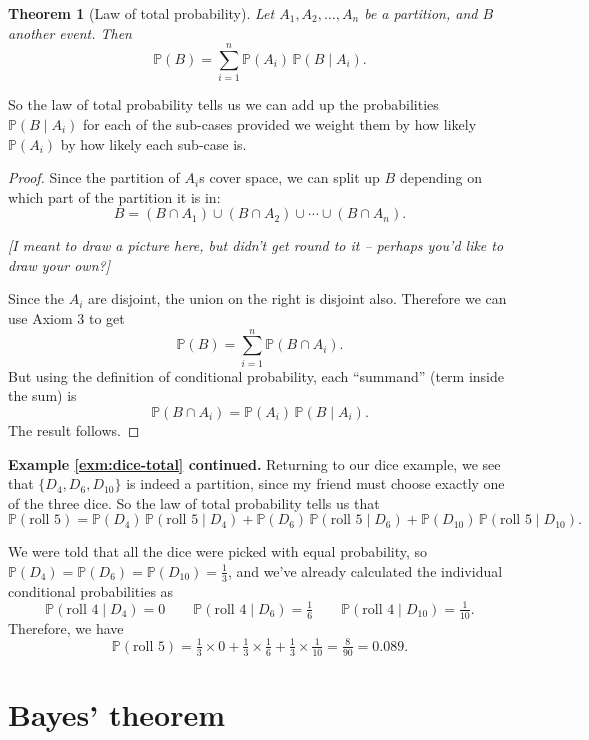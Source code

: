 \documentclass[
  a4paper,
]{book}
\newtheorem{theorem}{Theorem}[chapter]
\theoremstyle{definition}
\theoremstyle{definition}
\theoremstyle{definition}
\theoremstyle{definition}
\theoremstyle{remark}
\begin{document}
\begin{theorem}[Law of total probability]
\protect\hypertarget{thm:thlawtotal}{}\label{thm:thlawtotal}Let \(A_1, A_2, \dots, A_n\) be a partition, and \(B\) another event. Then
\[ \mathbb P(B) = \sum_{i=1}^n \mathbb P(A_i) \, \mathbb P(B \mid A_i) . \]
\end{theorem}

So the law of total probability tells us we can add up the probabilities \(\mathbb P(B \mid A_i)\) for each of the sub-cases provided we weight them by how likely \(\mathbb P(A_i)\) by how likely each sub-case is.

\begin{proof}
Since the partition of \(A_i\)s cover space, we can split up \(B\) depending on which part of the partition it is in:
\[  B = (B \cap A_1) \cup (B \cap A_2) \cup \cdots \cup (B \cap A_n) .  \]

\emph{{[}I meant to draw a picture here, but didn't get round to it -- perhaps you'd like to draw your own?{]}}

Since the \(A_i\) are disjoint, the union on the right is disjoint also.
Therefore we can use Axiom 3 to get
\[ \mathbb P(B) = \sum_{i=1}^n \mathbb P(B \cap A_i) . \]
But using the definition of conditional probability, each ``summand'' (term inside the sum) is
\[ \mathbb P(B \cap A_i) = \mathbb P(A_i) \, \mathbb P(B \mid A_i) . \]
The result follows.
\end{proof}

\textbf{Example \ref{exm:dice-total} continued.} Returning to our dice example, we see that \(\{D_4, D_6, D_{10}\}\) is indeed a partition, since my friend must choose exactly one of the three dice. So the law of total probability tells us that
\[ \mathbb P(\text{roll 5}) = \mathbb P(D_4) \, \mathbb P(\text{roll 5} \mid D_4) +  \mathbb P(D_6) \, \mathbb P(\text{roll 5} \mid D_6) + \mathbb P(D_{10}) \, \mathbb P(\text{roll 5} \mid D_{10}) . \]

We were told that all the dice were picked with equal probability, so \(\mathbb P(D_4) = \mathbb P(D_6) = \mathbb P(D_{10}) = \frac13\), and we've already calculated the individual conditional probabilities as
\[ \mathbb P(\text{roll 4} \mid D_4) = 0 \qquad \mathbb P(\text{roll 4} \mid D_6) = \tfrac16 \qquad \mathbb P(\text{roll 4} \mid D_{10}) = \tfrac{1}{10} .  \]
Therefore, we have
\[ \mathbb P(\text{roll 5}) = \tfrac13\times 0 +  \tfrac13\times\tfrac16 +  \tfrac13\times\tfrac1{10} = \tfrac{8}{90} = 0.089. \]

\hypertarget{bayes}{%
\section{Bayes' theorem}\label{bayes}}
\end{document}
